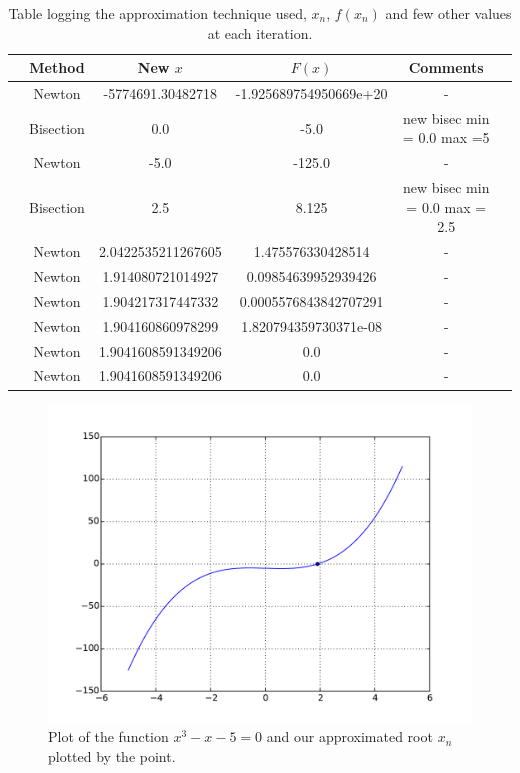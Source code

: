 \documentclass[a4paper,11pt]{article}
\begin{document}
\begin{center}
	\begin{table}[h!]
		\begin{tabular}{|c|c|c|c|c|c|}
			\hline
			& \textbf{Method} & \textbf{New $x$} & \textbf{$F(x)$} & \textbf{Comments} & \\
			\hline
			& Newton & -5774691.30482718 & -1.925689754950669e+20 & - & \\
			\hline
			& Bisection & 0.0 & -5.0 & new bisec min = 0.0  max =5 & \\
			\hline
			& Newton & -5.0 & -125.0 & - & \\
			\hline
			& Bisection & 2.5 & 8.125 & new bisec min = 0.0 max = 2.5 & \\
			\hline
			& Newton & 2.0422535211267605 & 1.475576330428514 & - &\\
			\hline
			& Newton & 1.914080721014927 & 0.09854639952939426 &- & \\
			\hline
			& Newton & 1.904217317447332 & 0.0005576843842707291 & - &\\
			\hline
			& Newton & 1.904160860978299 & 1.820794359730371e-08 & - &\\
			\hline
			& Newton & 1.9041608591349206 & 0.0 & - &\\
			\hline
			& Newton & 1.9041608591349206 & 0.0 & - &\\
			\hline
		\end{tabular}
		\caption{ Table logging the approximation technique used, $x_n$, $f(x_n)$ and few other values at each iteration.}
		\label{table:2}
	\end{table}
\end{center}

\begin{figure}[h]
\centering
\includegraphics[scale=0.45]{solution2b_fig.pdf}
\caption{Plot of the function $x^3 - x - 5 = 0$ and our approximated root $x_n$ plotted by the point.}
\label{fig:solution2b_fig}
\end{figure}
\end{document}
